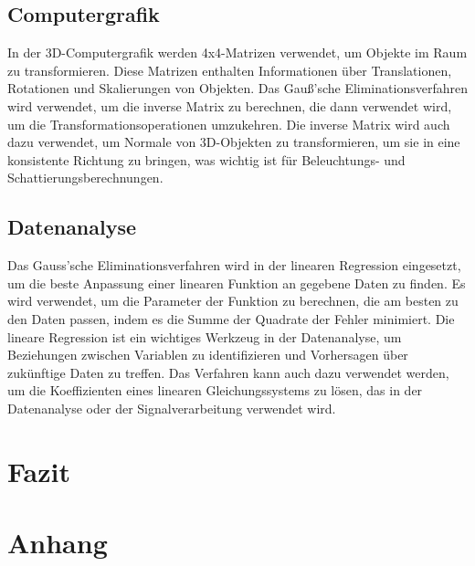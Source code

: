 \documentclass[a4paper, 12pt]{report}
\begin{document}
\begin{sloppypar}
\section{Computergrafik}
In der 3D-Computergrafik werden 4x4-Matrizen verwendet, um Objekte im Raum zu transformieren.
Diese Matrizen enthalten Informationen über Translationen, Rotationen und Skalierungen von Objekten.
Das Gauß'sche Eliminationsverfahren wird verwendet, um die inverse Matrix zu berechnen, die dann verwendet wird,
um die Transformationsoperationen umzukehren. Die inverse Matrix wird auch dazu verwendet, um Normale von 3D-Objekten zu transformieren,
um sie in eine konsistente Richtung zu bringen, was wichtig ist für Beleuchtungs- und Schattierungsberechnungen.

\section{Datenanalyse}
Das Gauss'sche Eliminationsverfahren wird in der linearen Regression eingesetzt, um die beste Anpassung einer linearen Funktion an gegebene Daten
zu finden. Es wird verwendet, um die Parameter der Funktion zu berechnen, die am besten zu den Daten passen, indem es die Summe der Quadrate der Fehler minimiert. Die lineare Regression ist ein wichtiges Werkzeug in der Datenanalyse, um Beziehungen zwischen Variablen zu identifizieren und Vorhersagen über zukünftige Daten zu treffen.
Das Verfahren kann auch dazu verwendet werden, um die Koeffizienten eines linearen Gleichungssystems zu lösen, das in der Datenanalyse oder der Signalverarbeitung verwendet wird.
\chapter{Fazit}
\chapter{Anhang}

\printbibliography
\end{sloppypar}
\end{document}
